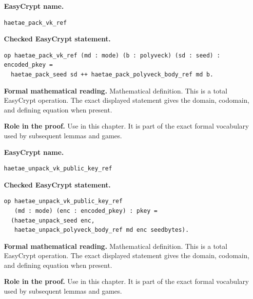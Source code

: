 \begin{formaldefinition}
\noindent\textbf{EasyCrypt name.}
\begin{lstlisting}[language=EasyCrypt,basicstyle=\ttfamily\scriptsize]
haetae_pack_vk_ref
\end{lstlisting}
\noindent\textbf{Checked EasyCrypt statement.}
\begin{lstlisting}[language=EasyCrypt,basicstyle=\ttfamily\scriptsize]
op haetae_pack_vk_ref (md : mode) (b : polyveck) (sd : seed) : encoded_pkey =
  haetae_pack_seed sd ++ haetae_pack_polyveck_body_ref md b.
\end{lstlisting}
\noindent\textbf{Formal mathematical reading.}
Mathematical definition. This is a total EasyCrypt operation.  The exact displayed statement gives the domain, codomain, and defining equation when present.

\noindent\textbf{Role in the proof.}
Use in this chapter. It is part of the exact formal vocabulary used by subsequent lemmas and games.

\end{formaldefinition}

\begin{formaldefinition}
\noindent\textbf{EasyCrypt name.}
\begin{lstlisting}[language=EasyCrypt,basicstyle=\ttfamily\scriptsize]
haetae_unpack_vk_public_key_ref
\end{lstlisting}
\noindent\textbf{Checked EasyCrypt statement.}
\begin{lstlisting}[language=EasyCrypt,basicstyle=\ttfamily\scriptsize]
op haetae_unpack_vk_public_key_ref
   (md : mode) (enc : encoded_pkey) : pkey =
  (haetae_unpack_seed enc,
   haetae_unpack_polyveck_body_ref md enc seedbytes).
\end{lstlisting}
\noindent\textbf{Formal mathematical reading.}
Mathematical definition. This is a total EasyCrypt operation.  The exact displayed statement gives the domain, codomain, and defining equation when present.

\noindent\textbf{Role in the proof.}
Use in this chapter. It is part of the exact formal vocabulary used by subsequent lemmas and games.

\end{formaldefinition}

